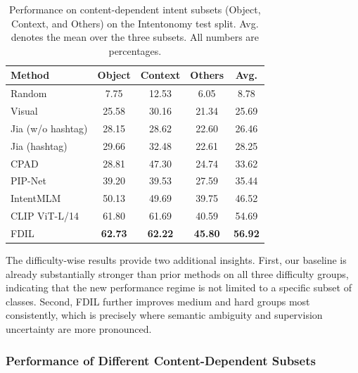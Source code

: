 \begin{table}[t]
\centering
\caption{Performance on content-dependent intent subsets (Object, Context, and Others) on the Intentonomy test split. Avg. denotes the mean over the three subsets. All numbers are percentages.}
\label{tab:content_results}
\begin{tabular}{lcccc}
\hline
Method & Object & Context & Others & Avg. \\
\hline
Random & 7.75 & 12.53 & 6.05 & 8.78 \\
Visual \cite{he_deep_2016} & 25.58 & 30.16 & 21.34 & 25.69 \\
Jia (w/o hashtag) \cite{jia_intentonomy_2021} & 28.15 & 28.62 & 22.60 & 26.46 \\
Jia (hashtag) \cite{jia_intentonomy_2021} & 29.66 & 32.48 & 22.61 & 28.25 \\
CPAD \cite{ye_cross-modality_2023} & 28.81 & 47.30 & 24.74 & 33.62 \\
PIP-Net \cite{wang_prototype-based_2023} & 39.20 & 39.53 & 27.59 & 35.44 \\
IntentMLM \cite{wang_unlocking_2026} & 50.13 & 49.69 & 39.75 & 46.52 \\
\hline
CLIP ViT-L/14 \cite{radford_learning_2021} & 61.80 & 61.69 & 40.59 & 54.69 \\
FDIL & \textbf{62.73} & \textbf{62.22} & \textbf{45.80} & \textbf{56.92} \\
\hline
\end{tabular}
\end{table}

The difficulty-wise results provide two additional insights. First, our baseline is already substantially stronger than prior methods on all three difficulty groups, indicating that the new performance regime is not limited to a specific subset of classes. Second, FDIL further improves medium and hard groups most consistently, which is precisely where semantic ambiguity and supervision uncertainty are more pronounced.

\subsubsection{Performance of Different Content-Dependent Subsets}

